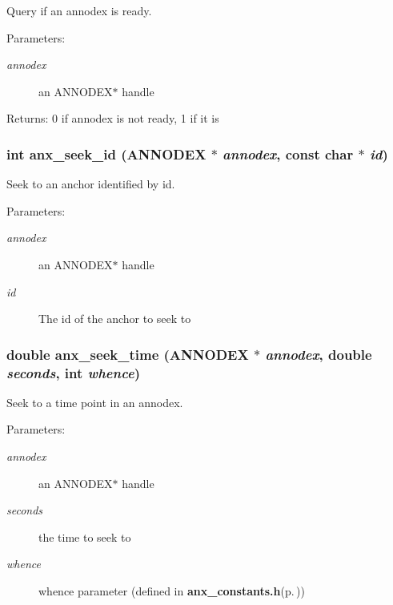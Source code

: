 Query if an annodex is ready. 

\begin{Desc}
\item[Parameters:]
\begin{description}
\item[{\em annodex}]an ANNODEX$\ast$ handle \end{description}
\end{Desc}
\begin{Desc}
\item[Returns:]0 if annodex is not ready, 1 if it is \end{Desc}
\subsubsection{\setlength{\rightskip}{0pt plus 5cm}int anx\_\-seek\_\-id ({\bf ANNODEX} $\ast$ {\em annodex}, const char $\ast$ {\em id})}\label{anx__general_8h_a14}


Seek to an anchor identified by id. 

\begin{Desc}
\item[Parameters:]
\begin{description}
\item[{\em annodex}]an ANNODEX$\ast$ handle \item[{\em id}]The id of the anchor to seek to \end{description}
\end{Desc}
\subsubsection{\setlength{\rightskip}{0pt plus 5cm}double anx\_\-seek\_\-time ({\bf ANNODEX} $\ast$ {\em annodex}, double {\em seconds}, int {\em whence})}\label{anx__general_8h_a18}


Seek to a time point in an annodex. 

\begin{Desc}
\item[Parameters:]
\begin{description}
\item[{\em annodex}]an ANNODEX$\ast$ handle \item[{\em seconds}]the time to seek to \item[{\em whence}]whence parameter (defined in {\bf anx\_\-constants.h}{\rm (p.\,\pageref{anx__constants_8h})}) \end{description}
\end{Desc}
